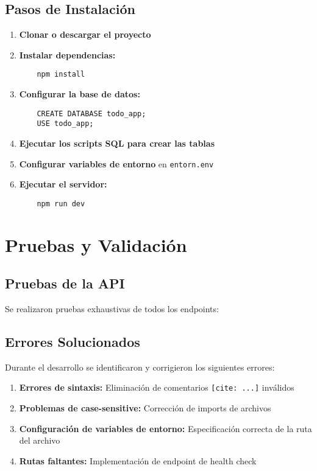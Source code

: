 \documentclass[12pt,a4paper]{article}
\begin{document}
\subsection{Pasos de Instalación}

\begin{enumerate}
    \item \textbf{Clonar o descargar el proyecto}
    \item \textbf{Instalar dependencias:}
    \begin{lstlisting}
    npm install
    \end{lstlisting}
    
    \item \textbf{Configurar la base de datos:}
    \begin{lstlisting}
    CREATE DATABASE todo_app;
    USE todo_app;
    \end{lstlisting}
    
    \item \textbf{Ejecutar los scripts SQL para crear las tablas}
    
    \item \textbf{Configurar variables de entorno} en \texttt{entorn.env}
    
    \item \textbf{Ejecutar el servidor:}
    \begin{lstlisting}
    npm run dev
    \end{lstlisting}
\end{enumerate}

\section{Pruebas y Validación}

\subsection{Pruebas de la API}

Se realizaron pruebas exhaustivas de todos los endpoints:



\subsection{Errores Solucionados}

Durante el desarrollo se identificaron y corrigieron los siguientes errores:

\begin{enumerate}
    \item \textbf{Errores de sintaxis:} Eliminación de comentarios \texttt{[cite: ...]} inválidos
    \item \textbf{Problemas de case-sensitive:} Corrección de imports de archivos
    \item \textbf{Configuración de variables de entorno:} Especificación correcta de la ruta del archivo
    \item \textbf{Rutas faltantes:} Implementación de endpoint de health check
\end{enumerate}
\end{document}
